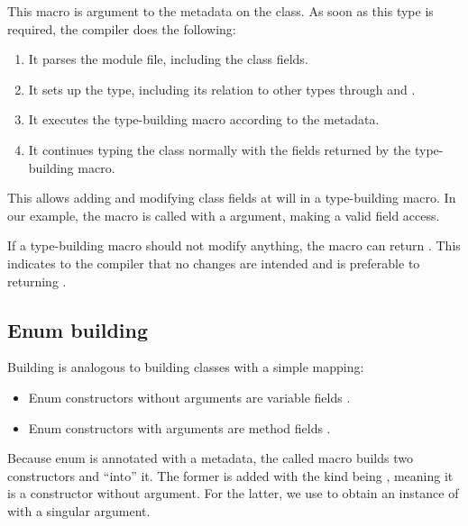 \documentclass{haxe}
\begin{document}
This macro is argument to the  metadata on the  class. As soon as this type is required, the compiler does the following:

\begin{enumerate}
	\item It parses the module file, including the class fields.
	\item It sets up the type, including its relation to other types through  and .
	\item It executes the type-building macro according to the  metadata.
	\item It continues typing the class normally with the fields returned by the type-building macro.
\end{enumerate}

This allows adding and modifying class fields at will in a type-building macro. In our example, the macro is called with a  argument, making  a valid field access.

If a type-building macro should not modify anything, the macro can return . This indicates to the compiler that no changes are intended and is preferable to returning .



\subsection{Enum building}
\label{macro-enum-building}

Building  is analogous to building classes with a simple mapping:

\begin{itemize}
	\item Enum constructors without arguments are variable fields .
	\item Enum constructors with arguments are method fields .
\end{itemize}



Because enum  is annotated with a  metadata, the called macro builds two constructors  and  ``into'' it. The former is added with the kind being , meaning it is a constructor without argument. For the latter, we use  to obtain an instance of  with a singular  argument.
\end{document}
